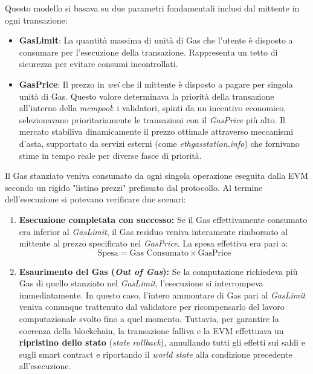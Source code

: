 Questo modello si basava su due parametri fondamentali inclusi dal mittente in ogni transazione:
\begin{itemize}
    \item \textbf{GasLimit}: La quantità massima di unità di Gas che l'utente è disposto a consumare per l'esecuzione della transazione. Rappresenta un tetto di sicurezza per evitare consumi incontrollati.
    \item \textbf{GasPrice}: Il prezzo in \textit{wei} che il mittente è disposto a pagare per singola unità di Gas. Questo valore determinava la priorità della transazione all'interno della \textit{mempool}: i validatori, spinti da un incentivo economico, selezionavano prioritariamente le transazioni con il \textit{GasPrice} più alto. Il mercato stabiliva dinamicamente il prezzo ottimale attraverso meccanismi d'asta, supportato da servizi esterni (come \textit{ethgasstation.info}) che fornivano stime in tempo reale per diverse fasce di priorità.
\end{itemize}

Il Gas stanziato veniva consumato da ogni singola operazione eseguita dalla EVM secondo un rigido "listino prezzi" prefissato dal protocollo. Al termine dell'esecuzione si potevano verificare due scenari:
\begin{enumerate}
    \item \textbf{Esecuzione completata con successo:} Se il Gas effettivamente consumato era inferior al \textit{GasLimit}, il Gas residuo veniva interamente rimborsato al mittente al prezzo specificato nel \textit{GasPrice}. La spesa effettiva era pari a:
    \[\text{Spesa} = \text{Gas Consumato} \times \text{GasPrice}\]
    \item \textbf{Esaurimento del Gas (\textit{Out of Gas}):} Se la computazione richiedeva più Gas di quello stanziato nel \textit{GasLimit}, l'esecuzione si interrompeva immediatamente. In questo caso, l'intero ammontare di Gas pari al \textit{GasLimit} veniva comunque trattenuto dal validatore per ricompensarlo del lavoro computazionale svolto fino a quel momento. Tuttavia, per garantire la coerenza della blockchain, la transazione falliva e la EVM effettuava un \textbf{ripristino dello stato} (\textit{state rollback}), annullando tutti gli effetti sui saldi e sugli smart contract e riportando il \textit{world state} alla condizione precedente all'esecuzione.
\end{enumerate}

